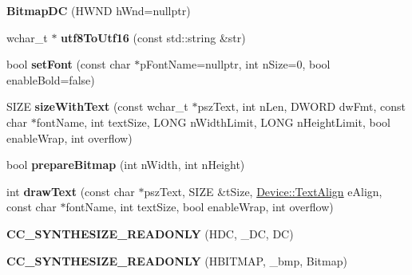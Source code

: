 \begin{DoxyCompactItemize}
\item 
\mbox{\label{classBitmapDC_a4b06ade4f42fdc9190e237b95eb80b1c}} 
{\bfseries Bitmap\+DC} (H\+W\+ND h\+Wnd=nullptr)
\item 
\mbox{\label{classBitmapDC_ae5fd152f4d81d8286333d04f411fce7b}} 
wchar\+\_\+t $\ast$ {\bfseries utf8\+To\+Utf16} (const std\+::string \&str)
\item 
\mbox{\label{classBitmapDC_a4db54e0a91debd9bd7b438f737a369af}} 
bool {\bfseries set\+Font} (const char $\ast$p\+Font\+Name=nullptr, int n\+Size=0, bool enable\+Bold=false)
\item 
\mbox{\label{classBitmapDC_a19af364aa1ea26d9b9dfc97f01e34e77}} 
S\+I\+ZE {\bfseries size\+With\+Text} (const wchar\+\_\+t $\ast$psz\+Text, int n\+Len, D\+W\+O\+RD dw\+Fmt, const char $\ast$font\+Name, int text\+Size, L\+O\+NG n\+Width\+Limit, L\+O\+NG n\+Height\+Limit, bool enable\+Wrap, int overflow)
\item 
\mbox{\label{classBitmapDC_a3fb1202baa22c950e67ef5317b0d4a7c}} 
bool {\bfseries prepare\+Bitmap} (int n\+Width, int n\+Height)
\item 
\mbox{\label{classBitmapDC_a8f65d0960037326e4041ec6cfe2dec45}} 
int {\bfseries draw\+Text} (const char $\ast$psz\+Text, S\+I\+ZE \&t\+Size, \hyperlink{classDevice_a62f8577d4803c8fce764f7cdff2abe92}{Device\+::\+Text\+Align} e\+Align, const char $\ast$font\+Name, int text\+Size, bool enable\+Wrap, int overflow)
\item 
\mbox{\label{classBitmapDC_a54c0364eb78e0b7aa089c7bfe28571d2}} 
{\bfseries C\+C\+\_\+\+S\+Y\+N\+T\+H\+E\+S\+I\+Z\+E\+\_\+\+R\+E\+A\+D\+O\+N\+LY} (H\+DC, \+\_\+\+DC, DC)
\item 
\mbox{\label{classBitmapDC_af21d2f17cc14cfc4607d9167a73cfd4d}} 
{\bfseries C\+C\+\_\+\+S\+Y\+N\+T\+H\+E\+S\+I\+Z\+E\+\_\+\+R\+E\+A\+D\+O\+N\+LY} (H\+B\+I\+T\+M\+AP, \+\_\+bmp, Bitmap)
\end{DoxyCompactItemize}
